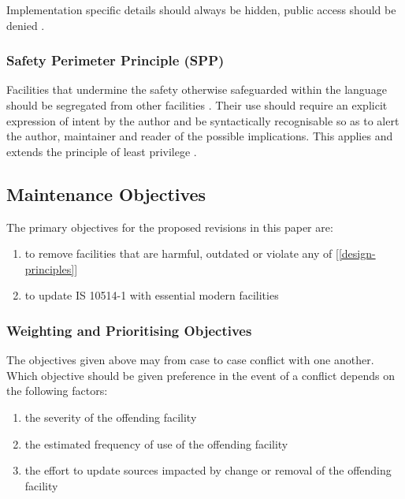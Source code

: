 \documentclass[10pt,a4paper,leqno,fleqn]{article}
\begin{document}
Implementation specific details should always be hidden, public access should
be denied \cite{Parnas72}.

\subsubsection{Safety Perimeter Principle (SPP)}
\label{SPP}

Facilities that undermine the safety otherwise safeguarded within the language
should be segregated from other facilities \cite[ch.29]{Wirth88}. Their
use should require an explicit expression of intent by the author and be
syntactically recognisable so as to alert the author, maintainer and reader
of the possible implications. This applies and extends the principle of least
privilege \cite{Saltzer74}.


\subsection{Maintenance Objectives}

The primary objectives for the proposed revisions in this paper are:

\renewcommand{\labelenumi}{(\arabic{enumi})}
\begin{enumerate}[leftmargin=!, labelindent=-0.75em, itemindent=0em]
\item to remove facilities that are harmful, outdated or violate
any of [\ref{design-principles}]
\item to update IS 10514-1 with essential modern facilities
\end{enumerate}

\subsubsection{Weighting and Prioritising Objectives}

\noindent The objectives given above may from case to case conflict with one
another. Which objective should be given preference in the event of a conflict
depends on the following factors:

\begin{enumerate}[itemindent=-0.75em]
\item the severity of the \gls{offending facility}
\item the estimated frequency of use of the \gls{offending facility}
\item the effort to update sources impacted by change or removal of the
\gls{offending facility}
\end{enumerate}
\end{document}
